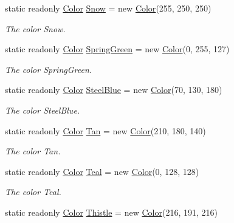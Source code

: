 \begin{DoxyCompactItemize}
static readonly \hyperlink{struct_tri_devs_1_1_tri_engine_1_1_color}{Color} \hyperlink{struct_tri_devs_1_1_tri_engine_1_1_color_a90a837f51ecebad035b922c3652c186d}{Snow} = new \hyperlink{struct_tri_devs_1_1_tri_engine_1_1_color}{Color}(255, 250, 250)
\begin{DoxyCompactList}\small\item\em The color Snow. \end{DoxyCompactList}\item 
static readonly \hyperlink{struct_tri_devs_1_1_tri_engine_1_1_color}{Color} \hyperlink{struct_tri_devs_1_1_tri_engine_1_1_color_ad645d6dd3150a45d3c99367d1d6adf9b}{Spring\-Green} = new \hyperlink{struct_tri_devs_1_1_tri_engine_1_1_color}{Color}(0, 255, 127)
\begin{DoxyCompactList}\small\item\em The color Spring\-Green. \end{DoxyCompactList}\item 
static readonly \hyperlink{struct_tri_devs_1_1_tri_engine_1_1_color}{Color} \hyperlink{struct_tri_devs_1_1_tri_engine_1_1_color_a527b230df9dbf7edb6b2138868269e8f}{Steel\-Blue} = new \hyperlink{struct_tri_devs_1_1_tri_engine_1_1_color}{Color}(70, 130, 180)
\begin{DoxyCompactList}\small\item\em The color Steel\-Blue. \end{DoxyCompactList}\item 
static readonly \hyperlink{struct_tri_devs_1_1_tri_engine_1_1_color}{Color} \hyperlink{struct_tri_devs_1_1_tri_engine_1_1_color_a4ec23dfe2d574bfe91ea6f4f1fe00bab}{Tan} = new \hyperlink{struct_tri_devs_1_1_tri_engine_1_1_color}{Color}(210, 180, 140)
\begin{DoxyCompactList}\small\item\em The color Tan. \end{DoxyCompactList}\item 
static readonly \hyperlink{struct_tri_devs_1_1_tri_engine_1_1_color}{Color} \hyperlink{struct_tri_devs_1_1_tri_engine_1_1_color_a20875bda1e6d890219d551fb2ac8b16d}{Teal} = new \hyperlink{struct_tri_devs_1_1_tri_engine_1_1_color}{Color}(0, 128, 128)
\begin{DoxyCompactList}\small\item\em The color Teal. \end{DoxyCompactList}\item 
static readonly \hyperlink{struct_tri_devs_1_1_tri_engine_1_1_color}{Color} \hyperlink{struct_tri_devs_1_1_tri_engine_1_1_color_ab97fe25803404918c876683856c11983}{Thistle} = new \hyperlink{struct_tri_devs_1_1_tri_engine_1_1_color}{Color}(216, 191, 216)

\end{DoxyCompactItemize}
